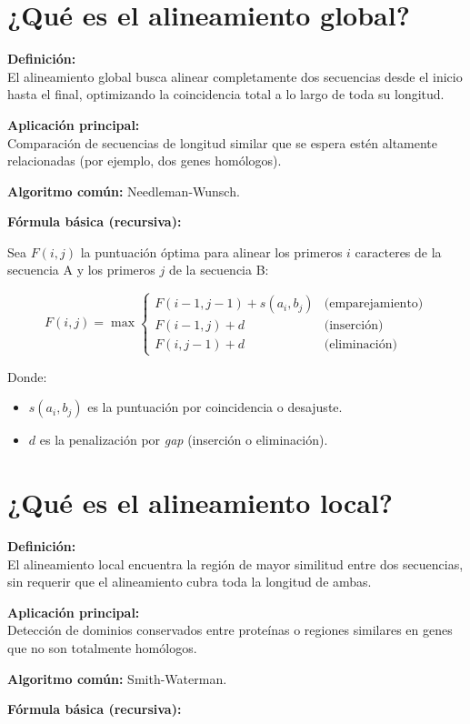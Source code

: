 \documentclass[fleqn,10pt]{article}
\begin{document}
\section{¿Qué es el alineamiento global?}
\textbf{Definición:} \\
El alineamiento global busca alinear completamente dos secuencias desde el inicio hasta el final, optimizando la coincidencia total a lo largo de toda su longitud.

\textbf{Aplicación principal:} \\
Comparación de secuencias de longitud similar que se espera estén altamente relacionadas (por ejemplo, dos genes homólogos).

\textbf{Algoritmo común:} Needleman-Wunsch.

\textbf{Fórmula básica (recursiva):}

Sea $F(i,j)$ la puntuación óptima para alinear los primeros $i$ caracteres de la secuencia A y los primeros $j$ de la secuencia B:

\[
F(i,j) = \max \begin{cases}
F(i-1, j-1) + s(a_i, b_j) & \text{(emparejamiento)} \\
F(i-1, j) + d & \text{(inserción)} \\
F(i, j-1) + d & \text{(eliminación)}
\end{cases}
\]

Donde:
\begin{itemize}
    \item $s(a_i, b_j)$ es la puntuación por coincidencia o desajuste.
    \item $d$ es la penalización por \textit{gap} (inserción o eliminación).
\end{itemize}

\section{¿Qué es el alineamiento local?}
\textbf{Definición:} \\
El alineamiento local encuentra la región de mayor similitud entre dos secuencias, sin requerir que el alineamiento cubra toda la longitud de ambas.

\textbf{Aplicación principal:} \\
Detección de dominios conservados entre proteínas o regiones similares en genes que no son totalmente homólogos.

\textbf{Algoritmo común:} Smith-Waterman.

\textbf{Fórmula básica (recursiva):}
\end{document}
